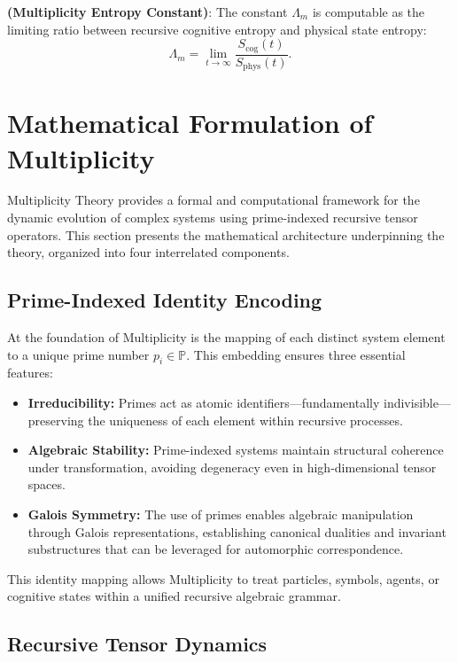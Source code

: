 \documentclass{article}
\theoremstyle{plain}
\begin{document}
\begin{conjecture}
\textbf{(Multiplicity Entropy Constant)}: The constant \( \Lambda_m \) is computable as the limiting ratio between recursive cognitive entropy and physical state entropy:
\[
\Lambda_m = \lim_{t \to \infty} \frac{S_{\text{cog}}(t)}{S_{\text{phys}}(t)}.
\]
\end{conjecture}


\section{Mathematical Formulation of Multiplicity}

Multiplicity Theory provides a formal and computational framework for the dynamic evolution of complex systems using prime-indexed recursive tensor operators. This section presents the mathematical architecture underpinning the theory, organized into four interrelated components.

\subsection{Prime-Indexed Identity Encoding}

At the foundation of Multiplicity is the mapping of each distinct system element to a unique prime number \( p_i \in \mathbb{P} \). This embedding ensures three essential features:

\begin{itemize}
    \item \textbf{Irreducibility:} Primes act as atomic identifiers—fundamentally indivisible—preserving the uniqueness of each element within recursive processes.
    \item \textbf{Algebraic Stability:} Prime-indexed systems maintain structural coherence under transformation, avoiding degeneracy even in high-dimensional tensor spaces.
    \item \textbf{Galois Symmetry:} The use of primes enables algebraic manipulation through Galois representations, establishing canonical dualities and invariant substructures that can be leveraged for automorphic correspondence.
\end{itemize}

This identity mapping allows Multiplicity to treat particles, symbols, agents, or cognitive states within a unified recursive algebraic grammar.

\subsection{Recursive Tensor Dynamics}
\end{document}

